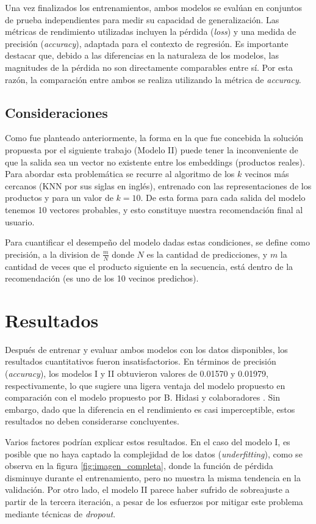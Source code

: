 \documentclass[runningheads]{llncs}
\begin{document}
    Una vez finalizados los entrenamientos, ambos modelos se evalúan en conjuntos de prueba independientes para medir su capacidad de generalización. Las métricas de rendimiento utilizadas incluyen la pérdida (\textit{loss}) y una medida de precisión (\textit{accuracy}), adaptada para el contexto de regresión. Es importante destacar que, debido a las diferencias en la naturaleza de los modelos, las magnitudes de la pérdida no son directamente comparables entre sí. Por esta razón, la comparación entre ambos se realiza utilizando la métrica de \textit{accuracy}.
    
\subsection{Consideraciones}
 	Como fue planteado anteriormente, la forma en la que fue concebida la solución propuesta por el siguiente trabajo (Modelo II) puede tener la inconveniente de que la salida sea un vector no existente entre los embeddings (productos reales). Para abordar esta problemática se recurre al algoritmo de los $k$ vecinos más cercanos (KNN por sus siglas en inglés), entrenado con las representaciones de los productos y para un valor de $k=10$. De esta forma para cada salida del modelo tenemos 10 vectores probables, y esto constituye nuestra recomendación final al usuario.
 	
 	Para cuantificar el desempeño del modelo dadas estas condiciones, se define como precisión, a la division de $\frac{m}{N}$ donde $N$ es la cantidad de predicciones, y $m$ la cantidad de veces que el producto siguiente en la secuencia, está dentro de la recomendación (es uno de los 10 vecinos predichos).


\section{Resultados}

Después de entrenar y evaluar ambos modelos con los datos disponibles, los resultados cuantitativos fueron insatisfactorios. En términos de precisión (\textit{accuracy}), los modelos I y II obtuvieron valores de 0.01570 y 0.01979, respectivamente, lo que sugiere una ligera ventaja del modelo propuesto en comparación con el modelo propuesto por B. Hidasi y colaboradores \cite{hidasi2015session}. Sin embargo, dado que la diferencia en el rendimiento es casi imperceptible, estos resultados no deben considerarse concluyentes.

Varios factores podrían explicar estos resultados. En el caso del modelo I, es posible que no haya captado la complejidad de los datos (\textit{underfitting}), como se observa en la figura \ref{fig:imagen_completa}, donde la función de pérdida disminuye durante el entrenamiento, pero no muestra la misma tendencia en la validación. Por otro lado, el modelo II parece haber sufrido de sobreajuste a partir de la tercera iteración, a pesar de los esfuerzos por mitigar este problema mediante técnicas de \textit{dropout}.
\end{document}

